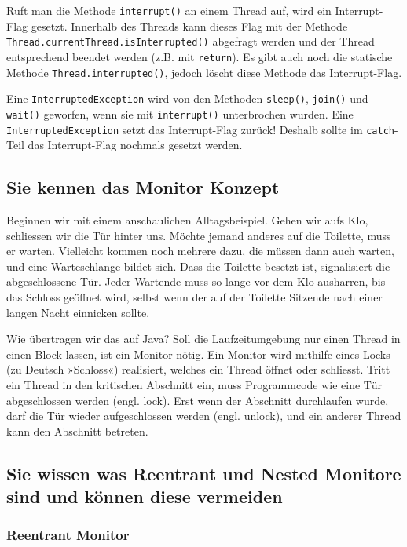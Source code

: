 Ruft man die Methode \texttt{interrupt()} an einem Thread auf, wird ein Interrupt-Flag gesetzt. Innerhalb des Threads kann dieses Flag mit der Methode \texttt{Thread.currentThread.isInterrupted()} abgefragt werden und der Thread entsprechend beendet werden (z.B. mit \texttt{return}). Es gibt auch noch die statische Methode \texttt{Thread.interrupted()}, jedoch löscht diese Methode das Interrupt-Flag.

Eine \texttt{InterruptedException} wird von den Methoden \texttt{sleep()}, \texttt{join()} und \texttt{wait()} geworfen, wenn sie mit \texttt{interrupt()} unterbrochen wurden. Eine \texttt{InterruptedException} setzt das Interrupt-Flag zurück! Deshalb sollte im \texttt{catch}-Teil das Interrupt-Flag nochmals gesetzt werden.

\subsection{Sie kennen das Monitor Konzept}

Beginnen wir mit einem anschaulichen Alltagsbeispiel. Gehen wir aufs Klo, schliessen wir die Tür hinter uns. Möchte jemand anderes auf die Toilette, muss er warten. Vielleicht kommen noch mehrere dazu, die müssen dann auch warten, und eine Warteschlange bildet sich. Dass die Toilette besetzt ist, signalisiert die abgeschlossene Tür. Jeder Wartende muss so lange vor dem Klo ausharren, bis das Schloss geöffnet wird, selbst wenn der auf der Toilette Sitzende nach einer langen Nacht einnicken sollte.

Wie übertragen wir das auf Java? Soll die Laufzeitumgebung nur einen Thread in einen Block lassen, ist ein Monitor nötig. Ein Monitor wird mithilfe eines Locks (zu Deutsch »Schloss«) realisiert, welches ein Thread öffnet oder schliesst. Tritt ein Thread in den kritischen Abschnitt ein, muss Programmcode wie eine Tür abgeschlossen werden (engl. lock). Erst wenn der Abschnitt durchlaufen wurde, darf die Tür wieder aufgeschlossen werden (engl. unlock), und ein anderer Thread kann den Abschnitt betreten.


\subsection{Sie wissen was Reentrant und Nested Monitore sind und können diese vermeiden}

\subsubsection{Reentrant Monitor}

